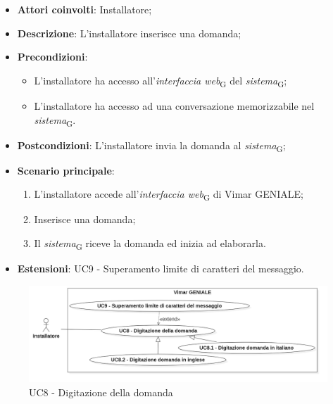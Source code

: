 \begin{itemize}
    \item \textbf{Attori coinvolti}: Installatore;
    \item \textbf{Descrizione}: L’installatore inserisce una domanda;
    \item \textbf{Precondizioni}: 
    \begin{itemize}
        \item L’installatore ha accesso all’\textit{interfaccia web}\textsubscript{G} del \textit{sistema}\textsubscript{G};
        \item L’installatore ha accesso ad una conversazione memorizzabile nel \textit{sistema}\textsubscript{G}.
    \end{itemize}
    \item \textbf{Postcondizioni}: L'installatore invia la domanda al \textit{sistema}\textsubscript{G};
    \item \textbf{Scenario principale}:
    \begin{enumerate}
        \item L’installatore accede all’\textit{interfaccia web}\textsubscript{G} di Vimar GENIALE;
        \item Inserisce una domanda;
        \item Il \textit{sistema}\textsubscript{G} riceve la domanda ed inizia ad elaborarla.
    \end{enumerate}
    \item \textbf{Estensioni}: UC9 - Superamento limite di caratteri del messaggio.
\end{itemize}
\begin{figure}[H]
\centering
\includegraphics[width=1\textwidth]{contents/casi_duso/png/UC8.png}
\caption{UC8 - Digitazione della domanda}
\end{figure}

